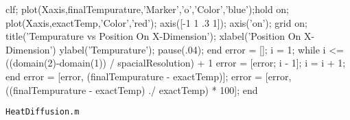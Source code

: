 \documentclass[12pt]{article}
\begin{document}
\begin{verbatimtab}
        clf;
        plot(Xaxis,finalTempurature,'Marker','o','Color','blue');hold on;
        plot(Xaxis,exactTemp,'Color','red');
        axis([-1 1 .3 1]);
        axis('on');
        grid on;
        title('Tempurature vs Position On X-Dimension');
        xlabel('Position On X-Dimension')
        ylabel('Tempurature');
        pause(.04);
    end
    error = [];
    i = 1;
    while i <= ((domain(2)-domain(1)) / spacialResolution) + 1
        error = [error; i - 1];
        i = i + 1;
    end
    error = [error, (finalTempurature - exactTemp)];
    error = [error, ((finalTempurature - exactTemp) ./ exactTemp) * 100];
end
\end{verbatimtab}
\clearpage
\texttt{HeatDiffusion.m}
\end{document}
